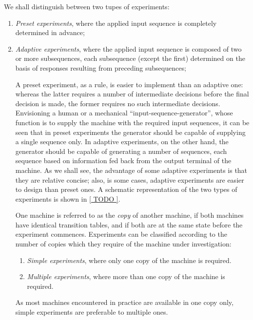    We shall distinguish between two tupes of experiments:
\begin{enumerate}
    \item \emph{Preset experiments}, where the applied input sequence is completely determined in advance;
    \item \emph{Adaptive experiments}, where the applied input sequence is composed of two or more subsequences, each subsequence (except the first) determined on the basis of responses resulting from preceding subsequences;

\begin{figure}
\end{figure}

    A preset experiment, as a rule, is easier to implement than an adaptive one: whereas the latter requires a number of intermediate decisions before the final decision is made, the former requires no such intermediate decisions. Envisioning a human or a mechanical ``input-sequence-generator'', whose function is to supply the machine with the required input sequences, it can be seen that in preset experiments the generator should be capable of supplying a single sequence only. In adaptive experiments, on the other hand, the generator should be capable of generating a number of sequences, each sequence based on information fed back from the output terminal of the machine. As we shall see, the advantage of some adaptive experiments is that they are relative concise; also, is some cases, adaptive experiments are easier to design than preset ones. A schematic representation of the two types of experiments is shown in \ref{ TODO }.

    One machine is referred to as the \emph{copy} of another machine, if both machines have identical transition tables, and if both are at the same state before the experiment commences. Experiments can be classified according to the number of copies which they require of the machine under investigation:

\begin{enumerate}
    \item \emph{Simple experiments}, where only one copy of the machine is required.
    \item \emph{Multiple experiments}, where more than one copy of the machine is required.
\end{enumerate}

    As most machines encountered in practice are available in one copy only, simple experiments are preferable to multiple ones.


\end{enumerate}
